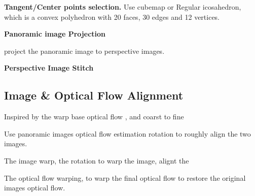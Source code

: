 

\textbf{Tangent/Center points selection.}
Use cubemap or Regular icosahedron, which is a convex polyhedron with 20 faces, 30 edges and 12 vertices.

%


\textbf{Panoramic image Projection}

project the panoramic image to perspective images.


\textbf{Perspective Image Stitch}



\subsection{Image \& Optical Flow Alignment}

Inspired by the warp base optical flow \cite{?}, and coarst to fine 

Use panoramic images optical flow estimation rotation to roughly align the two images.


The image warp, the rotation to warp the image, alignt the 

The optical flow warping, to warp the final optical flow to restore the original images optical flow.
